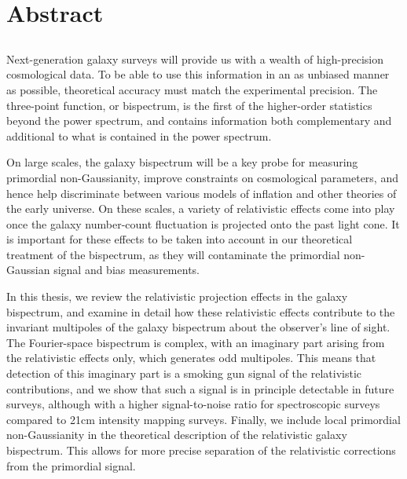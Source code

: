 \chapter*{Abstract}
\label{ch:abstract}
\section*{}
\singlespacing


Next-generation galaxy surveys will provide us with a wealth of high-precision cosmological data. To be able to use this information in an as unbiased manner as possible, theoretical accuracy must match the experimental precision. The three-point function, or bispectrum, is the first of the higher-order statistics beyond the power spectrum, and contains information both complementary and additional to what is contained in the power spectrum.

On large scales, the galaxy bispectrum will be a key probe for measuring primordial non-Gaussianity, improve constraints on cosmological parameters, and hence help discriminate between various models of inflation and other theories of the early universe. On these scales, a variety of relativistic effects come into play once the galaxy number-count fluctuation is projected onto the past light cone. It is important for these effects to be taken into account in our theoretical treatment of the bispectrum, as they will contaminate the primordial non-Gaussian signal and bias measurements. 

In this thesis, we review the relativistic projection effects in the galaxy bispectrum, and examine in detail how these relativistic effects contribute to the invariant multipoles of the galaxy bispectrum about the observer's line of sight. The Fourier-space bispectrum is complex, with an imaginary part arising from the relativistic effects only, which generates odd multipoles. This means that detection of this imaginary part is a smoking gun signal of the relativistic contributions, and we show that such a signal is in principle detectable in future surveys, although with a higher signal-to-noise ratio for spectroscopic surveys compared to 21cm intensity mapping surveys. Finally, we include local primordial non-Gaussianity in the theoretical description of the relativistic galaxy bispectrum. This allows for more precise separation of the relativistic corrections from the primordial signal.

\iffalse
Finally, we include local primordial non-Gaussianity in the theoretical description of the relativistic bispectrum, separating the relativistic corrections from the primordial signal, and use the bispectrum in Fisher matrix forecasts for cosmological parameters.
\fi

